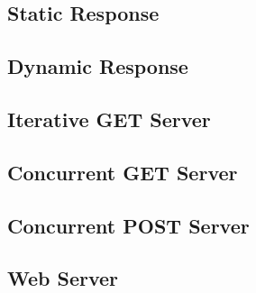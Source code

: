 \subsection{Static Response}\label{subsec:static_response}
\subsection{Dynamic Response}\label{subsec:dynamic_response}
\subsection{Iterative GET Server}\label{subsec:iterative_get_server}
\subsection{Concurrent GET Server}\label{subsec:concurrent_get_server}
\subsection{Concurrent POST Server}\label{subsec:concurrent_post_server}
\subsection{Web Server}\label{subsec:web_server}

